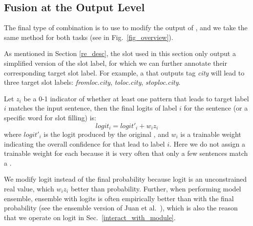 \subsection{Fusion at the Output Level}
\label{fusion_with_output}
The final type of combination is to use \RE to modify the output of \NN, and we take the same method for both tasks (see  in Fig.~\ref{fig_overview}).


As mentioned in Section \ref{re_desc},
the slot \REs used in this section only output a simplified version of the slot label, for which we can further
annotate their corresponding target slot label.
For example, a \RE that outputs tag \emph{city} will lead to three target slot labels: \emph{fromloc.city}, \emph{toloc.city}, \emph{stoploc.city}.

Let $z_i$ be a 0-1 indicator of whether at least one \RE pattern that leads to target label $i$ matches the input sentence, then the final logits of label $i$ for the sentence (or a specific word for slot filling) is:
\begin{equation}
logit_i = logit'_i + w_i z_i
\end{equation}
where $logit'_i$ is the logit produced by the original \NN, and $w_i$ is a trainable weight indicating the overall confidence for \REs that lead to label $i$.
Here we do not assign a trainable weight for each \RE because it is very often that only a few sentences match a \RE.

We modify logit instead of the final probability because logit is an unconstrained real value, which  $w_i z_i$ better than probability.
Further, when performing model ensemble,
ensemble with logits is often empirically better than with the final probability (see the ensemble version of Juan et al.~), which is also the reason that we operate on logit %
in Sec.~\ref{interact_with_module}.
